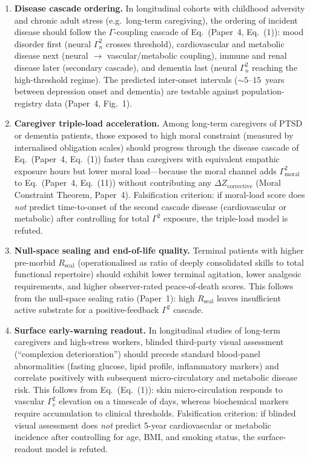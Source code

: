 \documentclass[aps,pre,twocolumn,superscriptaddress,floatfix]{revtex4-2}
\begin{document}
\begin{enumerate}
  \item \textbf{Disease cascade ordering.}
    In longitudinal cohorts with childhood adversity
    and chronic adult stress (e.g.\ long-term caregiving),
    the ordering of incident disease should follow the
    $\Gamma$-coupling cascade of
    Eq.~(Paper~4, Eq.~(1)):
    mood disorder first (neural $\Gamma_n^2$ crosses
    threshold), cardiovascular and metabolic disease
    next (neural $\to$ vascular/metabolic coupling),
    immune and renal disease later (secondary cascade),
    and dementia last (neural $\Gamma_n^2$ reaching
    the high-threshold regime).
    The predicted inter-onset intervals
    (${\sim}5$--$15$~years between depression onset
    and dementia) are testable against
    population-registry data
    (Paper~4,
    Fig.~1).

  \item \textbf{Caregiver triple-load acceleration.}
    Among long-term caregivers of PTSD or dementia
    patients, those exposed to high moral constraint
    (measured by internalised obligation scales) should
    progress through the disease cascade of
    Eq.~(Paper~4, Eq.~(1)) faster than
    caregivers with equivalent empathic exposure hours
    but lower moral load---because the moral channel
    adds $\Gamma^2_{\text{moral}}$ to
    Eq.~(Paper~4, Eq.~(11)) without contributing
    any $\Delta Z_{\text{corrective}}$
    (Moral Constraint Theorem, Paper~4).
    Falsification criterion: if moral-load score does
    \emph{not} predict time-to-onset of the second
    cascade disease (cardiovascular or metabolic)
    after controlling for total $\Gamma^2$ exposure,
    the triple-load model is refuted.

  \item \textbf{Null-space sealing and end-of-life
    quality.}
    Terminal patients with higher pre-morbid
    $R_{\text{seal}}$ (operationalised as ratio of
    deeply consolidated skills to total functional
    repertoire) should exhibit lower terminal agitation,
    lower analgesic requirements, and higher
    observer-rated peace-of-death scores.
    This follows from the null-space sealing ratio
    (Paper~1):
    high $R_{\text{seal}}$ leaves insufficient active
    substrate for a positive-feedback $\Gamma^2$ cascade.

  \item \textbf{Surface early-warning readout.}
    In longitudinal studies of long-term caregivers
    and high-stress workers, blinded third-party visual
    assessment (``complexion deterioration'') should
    precede standard blood-panel abnormalities
    (fasting glucose, lipid profile, inflammatory
    markers) and correlate positively with subsequent
    micro-circulatory and metabolic disease risk.
    This follows from Eq.~(Eq.~(1)):
    skin micro-circulation responds to vascular
    $\Gamma_v^2$ elevation on a timescale of days,
    whereas biochemical markers require accumulation
    to clinical thresholds.
    Falsification criterion: if blinded visual
    assessment does \emph{not} predict 5-year
    cardiovascular or metabolic incidence after
    controlling for age, BMI, and smoking status,
    the surface-readout model is refuted.


\end{enumerate}
\end{document}
